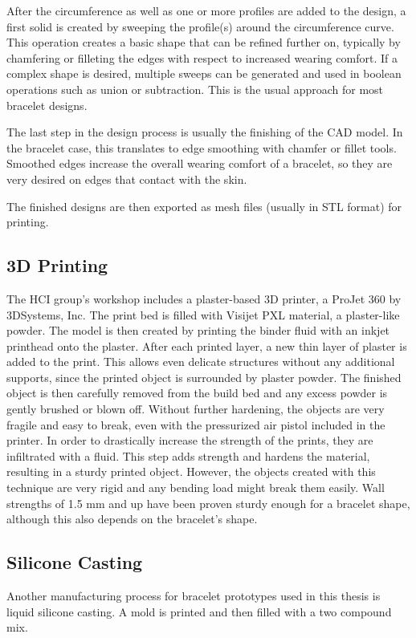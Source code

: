 After the circumference as well as one or more profiles are added to the design, a first solid is created by sweeping the profile(s) around the circumference curve. This operation creates a basic shape that can be refined further on, typically by chamfering or filleting the edges with respect to increased wearing comfort. If a complex shape is desired, multiple sweeps can be generated and used in boolean operations such as union or subtraction. This is the usual approach for most bracelet designs.

The last step in the design process is usually the finishing of the \ac{CAD} model. In the bracelet case, this translates to edge smoothing with chamfer or fillet tools. Smoothed edges increase the overall wearing comfort of a bracelet, so they are very desired on edges that contact with the skin.

The finished designs are then exported as mesh files (usually in \ac{STL} format) for printing.

\subsection{3D Printing}
The \ac{HCI} group's workshop includes a plaster-based 3D printer, a ProJet 360 by 3DSystems, Inc. The print bed is filled with Visijet PXL material, a plaster-like powder. The model is then created by printing the binder fluid with an inkjet printhead onto the plaster. After each printed layer, a new thin layer of plaster is added to the print. This allows even delicate structures without any additional supports, since the printed object is surrounded by plaster powder. The finished object is then carefully removed from the build bed and any excess powder is gently brushed or blown off. Without further hardening, the objects are very fragile and easy to break, even with the pressurized air pistol included in the printer. In order to drastically increase the strength of the prints, they are infiltrated with a fluid. This step adds strength and hardens the material, resulting in a sturdy printed object. However, the objects created with this technique are very rigid and any bending load might break them easily. Wall strengths of 1.5 mm and up have been proven sturdy enough for a bracelet shape, although this also depends on the bracelet's shape.

\subsection{Silicone Casting}
Another manufacturing process for bracelet prototypes used in this thesis is liquid silicone casting. A mold is printed and then filled with a two compound mix.

